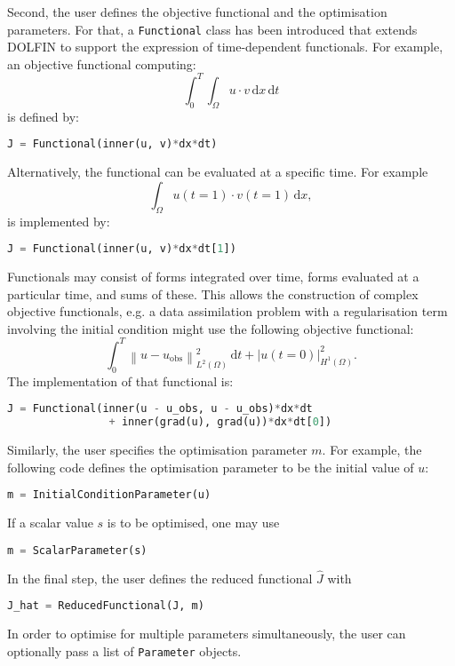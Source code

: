 \documentclass[prodmode,acmtoms]{acmsmall}
\newcommand{\dolfin}{{\mbox{DOLFIN}}\xspace}
\newcommand{\dx}{\,\mathrm{d}x}
\newcommand{\dt}{\,\mathrm{d}t}
\begin{document}
Second, the user defines the objective functional and the optimisation parameters.
For that, a \texttt{Functional} class has been introduced that extends \dolfin to support the expression of time-dependent functionals.
For example, an objective functional computing:
\begin{equation*}
\int_0^T \int_{\Omega} u \cdot v\dx \dt
\end{equation*} 
 is defined by: 
\begin{lstlisting}[language=Python,numbers=none]
J = Functional(inner(u, v)*dx*dt)
\end{lstlisting}
Alternatively, the functional can be evaluated at a specific time. For example  
\begin{equation*}
 \int_\Omega u(t=1) \cdot v(t=1) \dx,
\end{equation*}
is implemented by: 
\begin{lstlisting}[language=Python,numbers=none]
J = Functional(inner(u, v)*dx*dt[1])
\end{lstlisting}
Functionals may consist of forms integrated over time, forms evaluated at a particular time, and sums of these. 
This allows the construction of complex objective functionals, e.g. a data assimilation problem with a regularisation term involving the initial condition might use the following objective functional:
\begin{equation*}
\int_0^T \left\|u - u_{\textrm{obs}}\right\|_{L^2(\Omega)}^2 \dt + | u(t=0) |_{H^1(\Omega)}^2.
\end{equation*}
The implementation of that functional is:
\begin{lstlisting}[language=Python,numbers=none]
  J = Functional(inner(u - u_obs, u - u_obs)*dx*dt 
                + inner(grad(u), grad(u))*dx*dt[0]) 
\end{lstlisting}
Similarly, the user specifies the optimisation parameter $m$. 
For example, the following code defines the optimisation parameter to be the initial value of $u$: 
\begin{lstlisting}[language=Python,numbers=none]
      m = InitialConditionParameter(u)
\end{lstlisting}
If a scalar value $s$ is to be optimised, one may use
\begin{lstlisting}[language=Python,numbers=none]
      m = ScalarParameter(s)
\end{lstlisting}

In the final step, the user defines the reduced functional $\hat J$ with
\begin{lstlisting}[language=Python,numbers=none]
      J_hat = ReducedFunctional(J, m)
\end{lstlisting}
In order to optimise for multiple parameters simultaneously, the user can optionally pass a list of \texttt{Parameter} objects.
\end{document}
